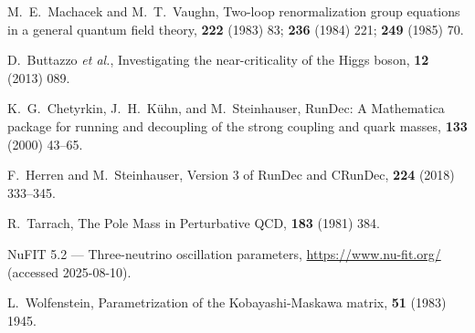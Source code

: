 \documentclass[%
  amsmath,amssymb,
  aps,
 prb,
 floatfix, showkeys
 ]{revtex4-2}
\begin{document}
\begin{thebibliography}{99}
 M.~E.~Machacek and M.~T.~Vaughn,
 \newblock Two-loop renormalization group equations in a general quantum field theory,
  {\bf 222} (1983) 83; {\bf 236} (1984) 221; {\bf 249} (1985) 70.
 
 D.~Buttazzo {\em et al.},
 \newblock Investigating the near-criticality of the Higgs boson,
  {\bf 12} (2013) 089.
 
 K.~G.~Chetyrkin, J.~H.~K\"uhn, and M.~Steinhauser,
 \newblock RunDec: A Mathematica package for running and decoupling of the strong coupling and quark masses,
  {\bf 133} (2000) 43--65.
 
 F.~Herren and M.~Steinhauser,
 \newblock Version 3 of RunDec and CRunDec,
  {\bf 224} (2018) 333--345.
 
 R.~Tarrach,
 \newblock The Pole Mass in Perturbative QCD,
  {\bf 183} (1981) 384.
 
 NuFIT 5.2 --- Three-neutrino oscillation parameters,
 \newblock \url{https://www.nu-fit.org/} (accessed 2025-08-10).
 
 L.~Wolfenstein,
 \newblock Parametrization of the Kobayashi-Maskawa matrix,
  {\bf 51} (1983) 1945.
 
 \end{thebibliography}
 
 
\end{document}
